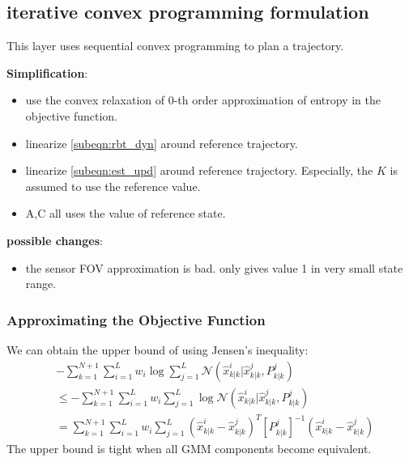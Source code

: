 \documentclass[letterpaper, 10 pt, conference]{ieeeconf}  %
\begin{document}
\subsection{iterative convex programming formulation}
This layer uses sequential convex programming to plan a trajectory. 

\textbf{Simplification}:
\begin{itemize}
	\item use the convex relaxation of $0$-th order approximation of entropy in the objective function.
	\item linearize \cref{subeqn:rbt_dyn} around reference trajectory.
	\item linearize \cref{subeqn:est_upd} around reference trajectory.  Especially, the $K$ is assumed to use the reference value.
	\item A,C all uses the value of reference state.
\end{itemize}

\textbf{possible changes}:
\begin{itemize}
	\item the sensor FOV approximation is bad. only gives value 1 in very small state range.
\end{itemize}

\subsubsection{Approximating the Objective Function}
We can obtain the upper bound of  using Jensen's inequality:
\begin{align*}
&-\sum\limits_{k=1}^{N+1} \sum\limits_{i=1}^{L}w_i\log \sum\limits_{j=1}^L\mathcal{N}(\hat{x}^i_{k|k}|\hat{x}^j_{k|k},P^j_{k|k})\\
&\leq -\sum\limits_{k=1}^{N+1} \sum\limits_{i=1}^{L}w_i \sum\limits_{j=1}^L\log\mathcal{N}(\hat{x}^i_{k|k}|\hat{x}^j_{k|k},P^j_{k|k})\\
&=\sum\limits_{k=1}^{N+1} \sum\limits_{i=1}^{L}w_i \sum\limits_{j=1}^L(\hat{x}^i_{k|k}-\hat{x}^j_{k|k})^T[P^j_{k|k}]^{-1}(\hat{x}^i_{k|k}-\hat{x}^j_{k|k})
\end{align*}
The upper bound is tight when all GMM components become equivalent.
\end{document}
